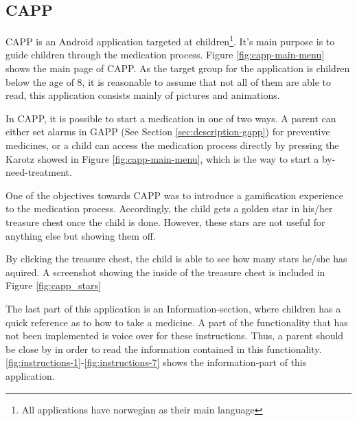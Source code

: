 \subsection{CAPP}
\label{sec:description-capp}
CAPP is an Android application targeted at children\footnote{All applications have norwegian as their main language}. It's main purpose is to guide children through the medication process. Figure \ref{fig:capp-main-menu} shows the main page of CAPP.  
As the target group for the application is children below the age of 8, it is reasonable to assume that not all of them are able to read, this application consists mainly of pictures and animations.


In CAPP, it is possible to start a medication in one of two ways. A parent can either set alarms in GAPP (See Section \ref{sec:description-gapp}) for preventive medicines, or a child can access the medication process directly by pressing the Karotz showed in Figure \ref{fig:capp-main-menu}, which is the way to start a by-need-treatment. 


One of the objectives towards CAPP was to introduce a gamification experience to the medication process. Accordingly, the child gets a golden star in his/her treasure chest once the child is done. However, these stars are not useful for anything else but showing them off.
  

By clicking the treasure chest, the child is able to see how many stars he/she has aquired. A screenshot showing the inside of the treasure chest is included in Figure \ref{fig:capp_stars} 


The last part of this application is an Information-section, where children has a quick reference as to how to take a medicine. A part of the functionality that has not been implemented is voice over for these instructions. Thus, a parent should be close by in order to read the information contained in this functionality.     
\ref{fig:instructions-1}-\ref{fig:instructions-7} shows the information-part of this application.



